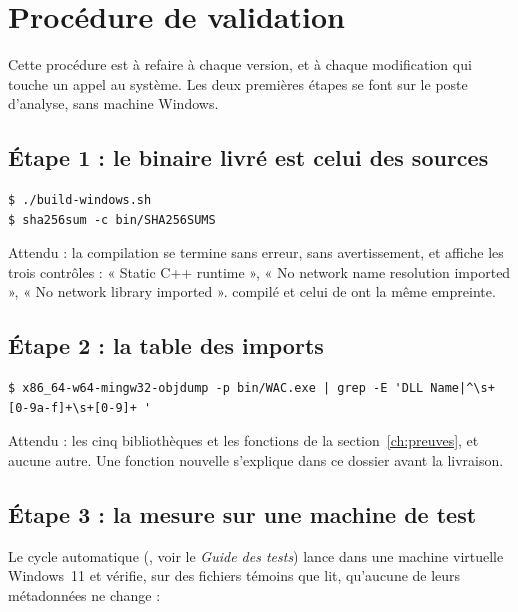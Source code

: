 \documentclass[11pt,a4paper,oneside]{report}
\begin{document}
\chapter{Procédure de validation}\label{ch:procedure}

Cette procédure est à refaire à chaque version, et à chaque modification qui
touche un appel au système. Les deux premières étapes se font sur le poste
d'analyse, sans machine Windows.

\section{Étape 1 : le binaire livré est celui des sources}

\begin{lstlisting}
$ ./build-windows.sh
$ sha256sum -c bin/SHA256SUMS
\end{lstlisting}

Attendu : la compilation se termine sans erreur, sans avertissement, et
affiche les trois contrôles : « Static C++ runtime », « No network name
resolution imported », « No network library imported ». 
compilé et celui de  ont la même empreinte.

\section{Étape 2 : la table des imports}

\begin{lstlisting}
$ x86_64-w64-mingw32-objdump -p bin/WAC.exe | grep -E 'DLL Name|^\s+[0-9a-f]+\s+[0-9]+ '
\end{lstlisting}

Attendu : les cinq bibliothèques et les fonctions de la
section~\ref{ch:preuves}, et aucune autre. Une fonction nouvelle
s'explique dans ce dossier avant la livraison.

\section{Étape 3 : la mesure sur une machine de test}

Le cycle automatique (, voir le \emph{Guide des
tests}) lance \wac{} dans une machine virtuelle Windows~11 et vérifie, sur des
fichiers témoins que \wac{} lit, qu'aucune de leurs métadonnées ne change :
\end{document}
